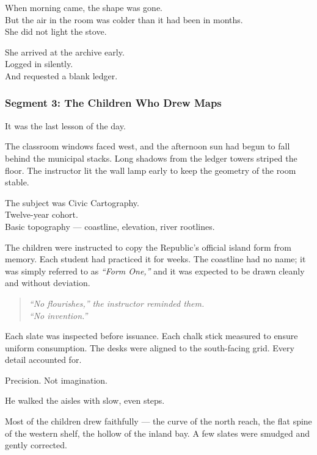 \documentclass[9pt]{article}
\begin{document}
\vspace{1em}

When morning came, the shape was gone.\\
But the air in the room was colder than it had been in months.\\
She did not light the stove.

She arrived at the archive early.\\
Logged in silently.\\
And requested a blank ledger.

\newpage

\subsubsection*{Segment 3: The Children Who Drew Maps}

It was the last lesson of the day.

The classroom windows faced west, and the afternoon sun had begun to fall behind the municipal stacks. Long shadows from the ledger towers striped the floor. The instructor lit the wall lamp early to keep the geometry of the room stable.

The subject was Civic Cartography.\\
Twelve-year cohort.\\
Basic topography --- coastline, elevation, river rootlines.

The children were instructed to copy the Republic’s official island form from memory. Each student had practiced it for weeks. The coastline had no name; it was simply referred to as \textit{“Form One,”} and it was expected to be drawn cleanly and without deviation.

\begin{quote}
\textit{“No flourishes,” the instructor reminded them.} \\
\textit{“No invention.”}
\end{quote}

Each slate was inspected before issuance. Each chalk stick measured to ensure uniform consumption. The desks were aligned to the south-facing grid. Every detail accounted for.

Precision. Not imagination.

\vspace{1em}

He walked the aisles with slow, even steps.

Most of the children drew faithfully --- the curve of the north reach, the flat spine of the western shelf, the hollow of the inland bay. A few slates were smudged and gently corrected.
\end{document}
